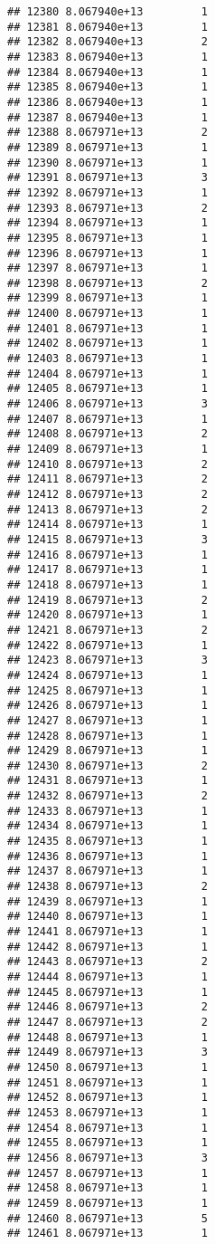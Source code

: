 \documentclass[
]{article}
\begin{document}
\begin{verbatim}
## 12380 8.067940e+13         1
## 12381 8.067940e+13         1
## 12382 8.067940e+13         2
## 12383 8.067940e+13         1
## 12384 8.067940e+13         1
## 12385 8.067940e+13         1
## 12386 8.067940e+13         1
## 12387 8.067940e+13         1
## 12388 8.067971e+13         2
## 12389 8.067971e+13         1
## 12390 8.067971e+13         1
## 12391 8.067971e+13         3
## 12392 8.067971e+13         1
## 12393 8.067971e+13         2
## 12394 8.067971e+13         1
## 12395 8.067971e+13         1
## 12396 8.067971e+13         1
## 12397 8.067971e+13         1
## 12398 8.067971e+13         2
## 12399 8.067971e+13         1
## 12400 8.067971e+13         1
## 12401 8.067971e+13         1
## 12402 8.067971e+13         1
## 12403 8.067971e+13         1
## 12404 8.067971e+13         1
## 12405 8.067971e+13         1
## 12406 8.067971e+13         3
## 12407 8.067971e+13         1
## 12408 8.067971e+13         2
## 12409 8.067971e+13         1
## 12410 8.067971e+13         2
## 12411 8.067971e+13         2
## 12412 8.067971e+13         2
## 12413 8.067971e+13         2
## 12414 8.067971e+13         1
## 12415 8.067971e+13         3
## 12416 8.067971e+13         1
## 12417 8.067971e+13         1
## 12418 8.067971e+13         1
## 12419 8.067971e+13         2
## 12420 8.067971e+13         1
## 12421 8.067971e+13         2
## 12422 8.067971e+13         1
## 12423 8.067971e+13         3
## 12424 8.067971e+13         1
## 12425 8.067971e+13         1
## 12426 8.067971e+13         1
## 12427 8.067971e+13         1
## 12428 8.067971e+13         1
## 12429 8.067971e+13         1
## 12430 8.067971e+13         2
## 12431 8.067971e+13         1
## 12432 8.067971e+13         2
## 12433 8.067971e+13         1
## 12434 8.067971e+13         1
## 12435 8.067971e+13         1
## 12436 8.067971e+13         1
## 12437 8.067971e+13         1
## 12438 8.067971e+13         2
## 12439 8.067971e+13         1
## 12440 8.067971e+13         1
## 12441 8.067971e+13         1
## 12442 8.067971e+13         1
## 12443 8.067971e+13         2
## 12444 8.067971e+13         1
## 12445 8.067971e+13         1
## 12446 8.067971e+13         2
## 12447 8.067971e+13         2
## 12448 8.067971e+13         1
## 12449 8.067971e+13         3
## 12450 8.067971e+13         1
## 12451 8.067971e+13         1
## 12452 8.067971e+13         1
## 12453 8.067971e+13         1
## 12454 8.067971e+13         1
## 12455 8.067971e+13         1
## 12456 8.067971e+13         3
## 12457 8.067971e+13         1
## 12458 8.067971e+13         1
## 12459 8.067971e+13         1
## 12460 8.067971e+13         5
## 12461 8.067971e+13         1

\end{verbatim}
\end{document}

